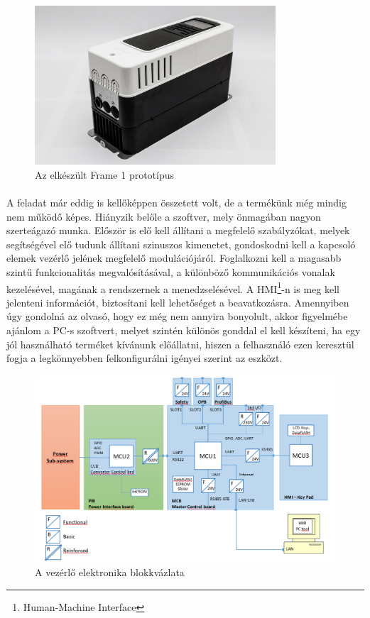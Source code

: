 \begin{figure}[h]
	\centering
	\includegraphics[width = 0.8\textwidth]{figures/n700_proto.jpg}
	\caption{Az elkészült Frame 1 prototípus} 
	\label{fig:n700_proto}
\end{figure}

\paragraph{}
A feladat már eddig is kellőképpen összetett volt, de a termékünk még mindig nem működő képes. Hiányzik belőle a szoftver, mely önmagában nagyon szerteágazó munka. Először is elő kell állítani a megfelelő szabályzókat, melyek segítségével elő tudunk állítani szinuszos kimenetet, gondoskodni kell a kapcsoló elemek vezérlő jelének megfelelő modulációjáról. Foglalkozni kell a magasabb szintű funkcionalitás megvalósításával, a különböző kommunikációs vonalak kezelésével, magának a rendszernek a menedzselésével. A HMI\footnote{Human-Machine Interface}-n is meg kell jelenteni információt, biztosítani kell lehetőséget a beavatkozásra. Amennyiben úgy gondolná az olvasó, hogy ez még nem annyira bonyolult, akkor figyelmébe ajánlom a PC-s szoftvert, melyet szintén különös gonddal el kell készíteni, ha egy jól használható terméket kívánunk előállatni, hiszen a felhasználó ezen keresztül fogja a legkönnyebben felkonfigurálni igényei szerint az eszközt.


\begin{figure}[h]
	\centering
	\includegraphics[width = \textwidth]{figures/architect.png}
	\caption{A vezérlő elektronika blokkvázlata} 
	\label{fig:hw_architect}
\end{figure}


